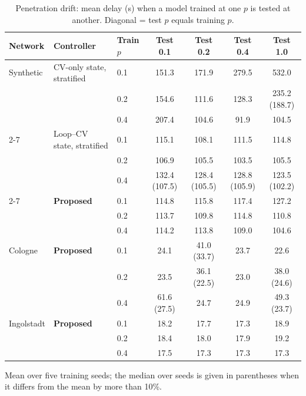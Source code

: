 \begin{table}[t]
\centering
\caption{Penetration drift: mean delay (s) when a model trained at one $p$ is tested at another. Diagonal = test $p$ equals training $p$.}
\label{tab:transfer}
\scriptsize
\setlength{\tabcolsep}{3pt}
\begin{tabular}{@{}lllcccc@{}}
\toprule
Network & Controller & Train $p$ & Test 0.1 & Test 0.2 & Test 0.4 & Test 1.0\\
\midrule
Synthetic & CV-only state, stratified & 0.1 & 151.3 & 171.9 & 279.5 & 532.0\\
 &  & 0.2 & 154.6 & 111.6 & 128.3 & 235.2 (188.7)\\
 &  & 0.4 & 207.4 & 104.6 & 91.9 & 104.5\\
\cmidrule(l){2-7}
 & Loop--CV state, stratified & 0.1 & 115.1 & 108.1 & 111.5 & 114.8\\
 &  & 0.2 & 106.9 & 105.5 & 103.5 & 105.5\\
 &  & 0.4 & 132.4 (107.5) & 128.4 (105.5) & 128.8 (105.9) & 123.5 (102.2)\\
\cmidrule(l){2-7}
 & \textbf{Proposed} & 0.1 & 114.8 & 115.8 & 117.4 & 127.2\\
 &  & 0.2 & 113.7 & 109.8 & 114.8 & 110.8\\
 &  & 0.4 & 114.2 & 113.8 & 109.0 & 104.6\\
\midrule
Cologne & \textbf{Proposed} & 0.1 & 24.1 & 41.0 (33.7) & 23.7 & 22.6\\
 &  & 0.2 & 23.5 & 36.1 (22.5) & 23.0 & 38.0 (24.6)\\
 &  & 0.4 & 61.6 (27.5) & 24.7 & 24.9 & 49.3 (23.7)\\
\midrule
Ingolstadt & \textbf{Proposed} & 0.1 & 18.2 & 17.7 & 17.3 & 18.9\\
 &  & 0.2 & 18.4 & 18.0 & 17.9 & 19.2\\
 &  & 0.4 & 17.5 & 17.3 & 17.3 & 17.3\\
\bottomrule
\end{tabular}

\vspace{2pt}
{\footnotesize Mean over five training seeds; the median over seeds is given in parentheses when it differs from the mean by more than 10\%.}
\end{table}
